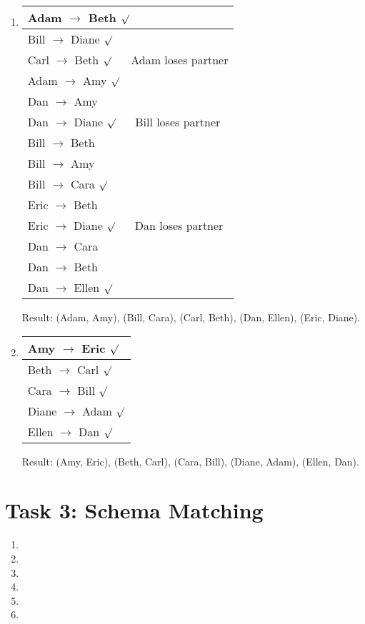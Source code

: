 \documentclass{scrartcl}
\begin{document}
\begin{enumerate}
		\item\phantom{phantom}
		\begin{center}
			\begin{tabular}{|l|}
				\hline
				Adam $\to$ Beth $\surd$\\\hline
				Bill $\to$ Diane $\surd$\\\hline
				Carl $\to$ Beth $\surd$ $\quad$ Adam loses partner\\\hline
				Adam $\to$ Amy $\surd$\\\hline
				Dan $\to$ Amy \lightning\\\hline
				Dan $\to$ Diane $\surd$ $\quad$ Bill loses partner\\\hline
				Bill $\to$ Beth \lightning\\\hline
				Bill $\to$ Amy \lightning\\\hline
				Bill $\to$ Cara $\surd$\\\hline
				Eric $\to$ Beth \lightning\\\hline
				Eric $\to$ Diane $\surd$ $\quad$ Dan loses partner\\\hline
				Dan $\to$ Cara \lightning\\\hline
				Dan $\to$ Beth \lightning\\\hline
				Dan $\to$ Ellen $\surd$\\
				\hline
			\end{tabular}
		\end{center}
		Result: (Adam, Amy), (Bill, Cara), (Carl, Beth), (Dan, Ellen), (Eric, Diane).
		
		\item\phantom{phantom}
		\begin{center}
			\begin{tabular}{|l|}
				\hline
				Amy $\to$ Eric $\surd$\\\hline
				Beth $\to$ Carl $\surd$\\\hline
				Cara $\to$ Bill $\surd$\\\hline
				Diane $\to$ Adam $\surd$\\\hline
				Ellen $\to$ Dan $\surd$\\
				\hline
			\end{tabular}
		\end{center}
	Result: (Amy, Eric), (Beth, Carl), (Cara, Bill), (Diane, Adam), (Ellen, Dan).
		
	\end{enumerate}
	
	\section*{Task 3: Schema Matching}
	\begin{enumerate}
		\item
		
		\item
		
		\item
		
		\item
		
		\item
		
		\item
		
	\end{enumerate}
\end{document}
